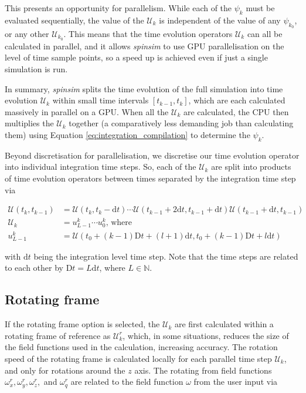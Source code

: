 \documentclass{jors}
\begin{document}
		This presents an opportunity for parallelism.
		While each of the \(\psi_k\) must be evaluated sequentially, the value of the \(\mathcal{U}_k\) is independent of the value of any \(\psi_{k_0}\), or any other \(\mathcal{U}_{k_0}\).
		This means that the time evolution operators \(\mathcal{U}_k\) can all be calculated in parallel, and it allows \emph{spinsim} to use GPU parallelisation on the level of time sample points, so a speed up is achieved even if just a single simulation is run.

		In summary, \emph{spinsim} splits the time evolution of the full simulation into time evolution \(\mathcal{U}_k\) within small time intervals \([t_{k - 1}, t_{k}]\), which are each calculated massively in parallel on a GPU.
		When all the \(\mathcal{U}_k\) are calculated, the CPU then multiplies the \(\mathcal{U}_k\) together (a comparatively less demanding job than calculating them) using Equation \eqref{eq:integration_compilation} to determine the \(\psi_k\).

		Beyond discretisation for parallelisation, we discretise our time evolution operator into individual integration time steps.
		So, each of the \(\mathcal{U}_k\) are split into products of time evolution operators between times separated by the integration time step via
		
		\begin{align}
			\mathcal{U}(t_k, t_{k-1}) &= \mathcal{U}(t_k, t_k - \mathrm{d}t) \cdots \mathcal{U}(t_{k-1} + 2\mathrm{d}t, t_{k-1} + \mathrm{d}t) \mathcal{U}(t_{k-1} + \mathrm{d}t, t_{k-1})\\
			\mathcal{U}_k &= u^k_{L-1} \cdots u^k_0\textrm{, where}\\
			u^k_{L-1} &= \mathcal{U}(t_0 + (k - 1)\mathrm{D}t + (l + 1)\mathrm{d}t, t_0 + (k - 1)\mathrm{D}t + l\mathrm{d}t)
		\end{align}

		with \(\mathrm{d}t\) being the integration level time step.
		Note that the time steps are related to each other by \(\mathrm{D}t = L\mathrm{d}t\), where \(L\in\mathbb{N}\).

	\subsection{Rotating frame}
		If the rotating frame option is selected, the \(\mathcal{U}_k\) are first calculated within a rotating frame of reference as \(\mathcal{U}^r_k\), which, in some situations, reduces the size of the field functions used in the calculation, increasing accuracy.
		The rotation speed of the rotating frame is calculated locally for each parallel time step \(\mathcal{U}_k\), and only for rotations around the \(z\) axis.
		The rotating from field functions \(\omega^r_x, \omega^r_y, \omega^r_z,\) and \(\omega^r_q\) are related to the field function \(\omega\) from the user input via
		
\end{document}
